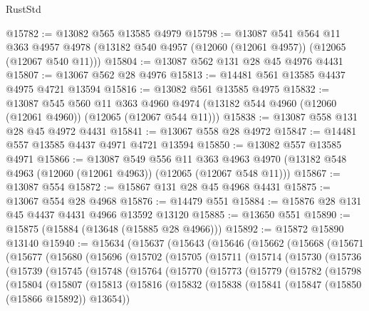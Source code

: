 \begin{lexlean}{RustStd}
\begin{coremodule}
@15782 := @13082 @565 @13585 @4979
@15798 := @13087
    @541
    @564
    @11
    @363
    @4957
    @4978
    (@13182 @540 @4957 (@12060 (@12061 @4957)) (@12065 (@12067 @540 @11)))
@15804 := @13087 @562 @131 @28 @45 @4976 @4431
@15807 := @13067 @562 @28 @4976
@15813 := @14481 @561 @13585 @4437 @4975 @4721 @13594
@15816 := @13082 @561 @13585 @4975
@15832 := @13087
    @545
    @560
    @11
    @363
    @4960
    @4974
    (@13182 @544 @4960 (@12060 (@12061 @4960)) (@12065 (@12067 @544 @11)))
@15838 := @13087 @558 @131 @28 @45 @4972 @4431
@15841 := @13067 @558 @28 @4972
@15847 := @14481 @557 @13585 @4437 @4971 @4721 @13594
@15850 := @13082 @557 @13585 @4971
@15866 := @13087
    @549
    @556
    @11
    @363
    @4963
    @4970
    (@13182 @548 @4963 (@12060 (@12061 @4963)) (@12065 (@12067 @548 @11)))
@15867 := @13087 @554
@15872 := @15867 @131 @28 @45 @4968 @4431
@15875 := @13067 @554 @28 @4968
@15876 := @14479 @551
@15884 := @15876 @28 @131 @45 @4437 @4431 @4966 @13592 @13120
@15885 := @13650 @551
@15890 := @15875 (@15884 (@13648 (@15885 @28 @4966)))
@15892 := @15872 @15890 @13140
@15940 := @15634
    (@15637
      (@15643
        (@15646
          (@15662
            (@15668
              (@15671
                (@15677
                  (@15680
                    (@15696
                      (@15702
                        (@15705
                          (@15711
                            (@15714
                              (@15730
                                (@15736
                                  (@15739
                                    (@15745
                                      (@15748
                                        (@15764
                                          (@15770
                                            (@15773
                                              (@15779
                                                (@15782
                                                  (@15798
                                                    (@15804
                                                      (@15807
                                                        (@15813
                                                          (@15816
                                                            (@15832
                                                              (@15838
                                                                (@15841
                                                                  (@15847
                                                                    (@15850 (@15866 @15892))
                                                                    @13654))

\end{coremodule}
\end{lexlean}
